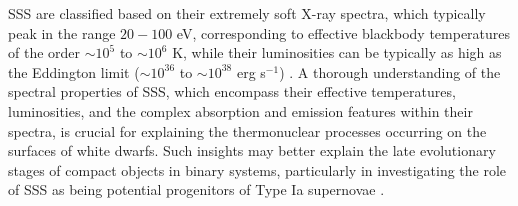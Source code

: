     SSS are classified based on their extremely soft X-ray spectra, which typically peak in the range $20-100$ eV, corresponding to effective blackbody temperatures of the order $\sim 10^5$ to $\sim 10^6$ K, while their luminosities can be typically as high as the Eddington limit ($\sim 10^{36}$ to $\sim 10^{38}$ erg s$^{-1}$) \cite{kahabka06}. A thorough understanding of the spectral properties of SSS, which encompass their effective temperatures, luminosities, and the complex absorption and emission features within their spectra, is crucial for explaining the thermonuclear processes occurring on the surfaces of white dwarfs. Such insights may better explain the late evolutionary stages of compact objects in binary systems, particularly in investigating the role of SSS as being potential progenitors of Type Ia supernovae \cite{di2006luminous}.
    
    
    
